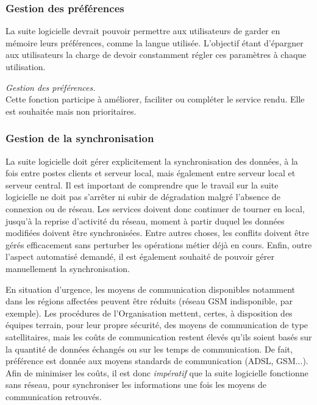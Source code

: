 \subsubsection{Gestion des préférences}
La suite logicielle devrait pouvoir permettre aux utilisateurs de garder en mémoire leurs préférences, comme la langue utilisée.
L'objectif étant d'épargner aux utilisateurs la charge de devoir constamment régler ces paramètres à chaque utilisation.
\begin{notation}
	\emph{Gestion des préférences.}
	\\
	Cette fonction participe à améliorer, faciliter ou compléter le service rendu.
	Elle est souhaitée mais non prioritaires.
\end{notation}

\subsubsection{Gestion de la synchronisation}
La suite logicielle doit gérer explicitement la synchronisation des données, à la fois entre postes clients et serveur local, mais également entre serveur local et serveur central.
Il est important de comprendre que le travail sur la suite logicielle ne doit pas s'arrêter ni subir de dégradation malgré l'absence de connexion ou de réseau.
Les services doivent donc continuer de tourner en local, jusqu'à la reprise d'activité du réseau, moment à partir duquel les données modifiées doivent être synchronisées.
Entre autres choses, les conflits doivent être gérés efficacement sans perturber les opérations métier déjà en cours.
Enfin, outre l'aspect automatisé demandé, il est également souhaité de pouvoir gérer manuellement la synchronisation.
\begin{constraint}
	En situation d'urgence, les moyens de communication disponibles notamment dans les régions affectées peuvent être \og{}réduits\fg{} (réseau GSM indisponible, par exemple).
	Les procédures de l'Organisation mettent, certes, à disposition des équipes terrain, pour leur propre sécurité, des moyens de communication de type satellitaires, mais les coûts de communication restent élevés qu'ils soient basés sur la quantité de données échangés ou sur les temps de communication.
	De fait, préférence est donnée aux moyens \og{}standards\fg{} de communication (ADSL, GSM...).
	Afin de minimiser les coûts, il est donc \emph{impératif} que la suite logicielle fonctionne sans réseau, pour synchroniser les informations une fois les moyens de communication retrouvés.
\end{constraint}

